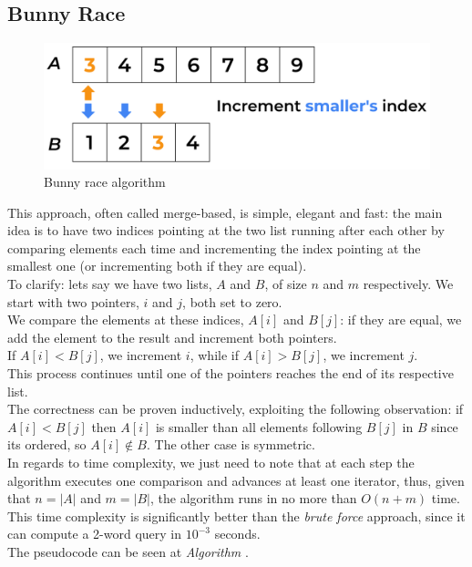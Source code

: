 \subsection{Bunny Race \label{sec:bunnyrace}}

\begin{figure}[H] 
    \begin{center}
        \includegraphics[width=.8\textwidth]{imgs/bunny_search.png}
        \caption{Bunny race algorithm \label{fig:bunnyrace}}
    \end{center}
\end{figure}

This approach, often called merge-based, is simple, elegant and fast: the main idea is to have two indices pointing at the two list running after each other by comparing elements each time and incrementing the index pointing at the smallest one (or incrementing both if they are equal).\\ 
To clarify: lets say we have two lists, $A$ and $B$, of size $n$ and $m$ respectively. We start with two pointers, $i$ and $j$, both set to zero. \\
We compare the elements at these indices, $A[i]$ and $B[j]$: if they are equal, we add the element to the result and increment both pointers. \\
If $A[i] < B[j]$, we increment $i$, while if $A[i] > B[j]$, we increment $j$. \\
This process continues until one of the pointers reaches the end of its respective list.\\
The correctness can be proven inductively, exploiting the following observation: if $A[i] < B[j]$ then $A[i]$ is smaller than all elements following $B[j]$ in $B$ since its ordered, so $A[i] \notin B$. The other case is symmetric. \\
In regards to time complexity, we just need to note that at each step the algorithm executes one comparison and advances at least one iterator, thus, given that $n=|A|$ and $m=|B|$, the algorithm runs in no more than $O(n+m)$ time.\\
This time complexity is significantly better than the \textit{brute force}  approach, since it can compute a 2-word query in $10^{-3}$ seconds. \\
The pseudocode can be seen at \textit{Algorithm} .

